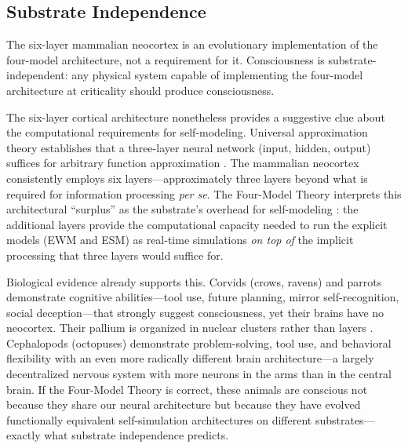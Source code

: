 \documentclass[12pt]{article}
\begin{document}
\subsection{Substrate Independence}

The six-layer mammalian neocortex is an evolutionary implementation of the four-model architecture, not a requirement for it. Consciousness is substrate-independent: any physical system capable of implementing the four-model architecture at criticality should produce consciousness.

The six-layer cortical architecture nonetheless provides a suggestive clue about the computational requirements for self-modeling. Universal approximation theory establishes that a three-layer neural network (input, hidden, output) suffices for arbitrary function approximation \citep{Cybenko1989,Hornik1989}. The mammalian neocortex consistently employs six layers---\hspace{0pt}approximately three layers beyond what is required for information processing \emph{per se}. The Four-Model Theory interprets this architectural ``surplus'' as the substrate's overhead for self-modeling \citep{Gruber2015}: the additional layers provide the computational capacity needed to run the explicit models (EWM and ESM) as real-time simulations \emph{on top of} the implicit processing that three layers would suffice for.

Biological evidence already supports this. Corvids (crows, ravens) and parrots demonstrate cognitive abilities---\hspace{0pt}tool use, future planning, mirror self-recognition, social deception---\hspace{0pt}that strongly suggest consciousness, yet their brains have no neocortex. Their pallium is organized in nuclear clusters rather than layers \citep{Gunturkun2016}. Cephalopods (octopuses) demonstrate problem-solving, tool use, and behavioral flexibility with an even more radically different brain architecture---\hspace{0pt}a largely decentralized nervous system with more neurons in the arms than in the central brain. If the Four-Model Theory is correct, these animals are conscious not because they share our neural architecture but because they have evolved functionally equivalent self-simulation architectures on different substrates---\hspace{0pt}exactly what substrate independence predicts.
\end{document}
